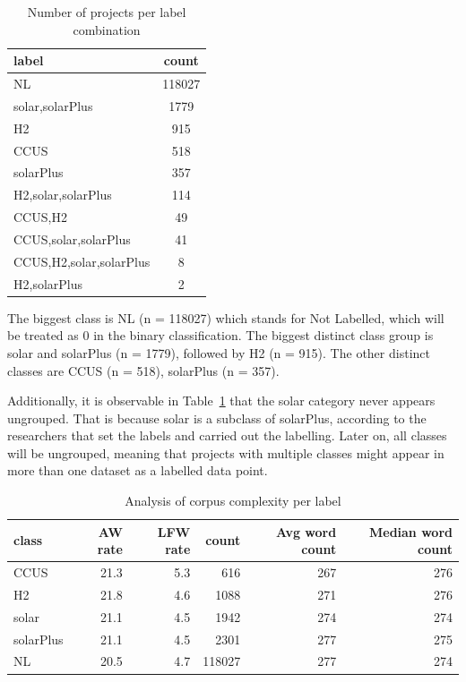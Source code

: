 \documentclass{article}
\begin{document}
\begin{table}
  \centering
  \begin{tabular}{lc}
      \hline
        label & count \\
        \hline
        NL                    & 118027 \\
        solar,solarPlus       & 1779   \\
        H2                    & 915    \\
        CCUS                  & 518    \\
        solarPlus             & 357    \\
        H2,solar,solarPlus    & 114    \\
        CCUS,H2               & 49     \\
        CCUS,solar,solarPlus  & 41     \\
        CCUS,H2,solar,solarPlus & 8    \\
        H2,solarPlus          & 2      \\\hline
  \end{tabular}
  \caption{Number of projects per label combination}\label{table:labels}
\end{table}

The biggest class is NL (n = 118027) which stands for Not Labelled, which will be treated as 0 in the binary classification. The biggest distinct class group is solar and solarPlus (n = 1779), followed by H2 (n = 915). The other distinct classes are CCUS (n = 518),
solarPlus (n = 357).

Additionally, it is observable in Table~\ref{table:labels} that the solar category never appears ungrouped. That is because solar is a subclass of solarPlus, according to the researchers that set the labels and carried out the labelling.
Later on, all classes will be ungrouped, meaning that projects with multiple classes might appear in more than one dataset as a labelled data point.

\begin{table}
  \centering
    \begin{tabular}{lrrrrr}
      \hline
      class & AW rate & LFW rate & count & Avg word count & Median word count \\
      \hline
      CCUS & 21.3 & 5.3 & 616 & 267 & 276 \\
      H2 & 21.8 & 4.6 & 1088 & 271 & 276 \\
      solar & 21.1 & 4.5 & 1942 & 274 & 274 \\
      solarPlus & 21.1 & 4.5 & 2301 & 277 & 275 \\
      NL & 20.5 & 4.7 & 118027 & 277 & 274 \\
      \hline
    \end{tabular}
    \caption{Analysis of corpus complexity per label}
    \label{table:classDesc}
\end{table}
\end{document}
